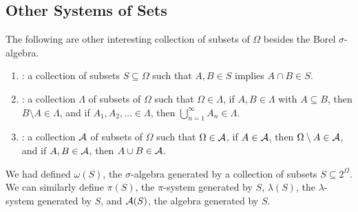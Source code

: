 \subsection{Other Systems of Sets}

The following are other interesting collection of subsets of $\Omega$ besides the Borel $\sigma$-algebra. 

\begin{enumerate}
    \item {}: a collection of subsets $S \subseteq \Omega$ such that $A,B \in S$ implies $A \cap B \in S$.
    \item {}: a collection $\Lambda$ of subsets of $\Omega$ such that $\Omega \in \Lambda$, if $A,B \in \Lambda$ with $A \subseteq B$, then $B \setminus A \in \Lambda$, and if $A_{1},A_{2},\ldots \in \Lambda$, then $\bigcup_{n=1}^{\infty}A_{n} \in \Lambda$.
    \item {}: a collection $\mathcal{A}$ of subsets of $\Omega$ such that $\Omega \in \mathcal{A}$, if $A \in \mathcal{A}$, then $\Omega \setminus A \in \mathcal{A}$, and if $A,B \in \mathcal{A}$, then $A \cup B \in \mathcal{A}$.
\end{enumerate}

We had defined $\omega(S)$, the $\sigma$-algebra generated by a collection of subsets $S \subseteq 2^{\Omega}$. We can similarly define $\pi(S)$, the $\pi$-system generated by $S$, $\lambda(S)$, the $\lambda$-system generated by $S$, and $\mathcal{A}(S)$, the algebra generated by $S$. 

